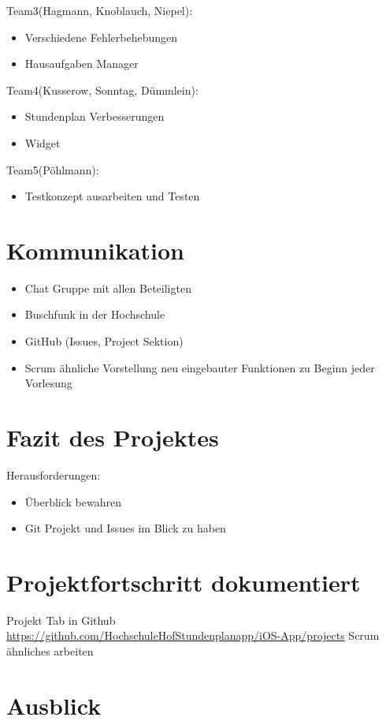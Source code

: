 Team3(Hagmann, Knoblauch, Niepel):
\begin{itemize}
\item Verschiedene Fehlerbehebungen
\item Hausaufgaben Manager
\end{itemize}


Team4(Kusserow, Sonntag, Dümmlein):
\begin{itemize}
\item Stundenplan Verbesserungen
\item Widget
\end{itemize}


Team5(Pöhlmann):
\begin{itemize}
\item Testkonzept ausarbeiten und Testen
\end{itemize}


\section{Kommunikation}
\begin{itemize}
\item Chat Gruppe mit allen Beteiligten
\item Buschfunk in der Hochschule
\item GitHub (Issues, Project Sektion)
\item Scrum ähnliche Vorstellung neu eingebauter Funktionen zu Beginn jeder Vorlesung
\end{itemize}


\section{Fazit des Projektes}
Herausforderungen:
\begin{itemize}
\item Überblick bewahren
\item Git Projekt und Issues im Blick zu haben
\end{itemize}


\section{Projektfortschritt dokumentiert}
Projekt Tab in Github\\
\url{https://github.com/HochschuleHofStundenplanapp/iOS-App/projects}
Scrum ähnliches arbeiten




\section{Ausblick}

